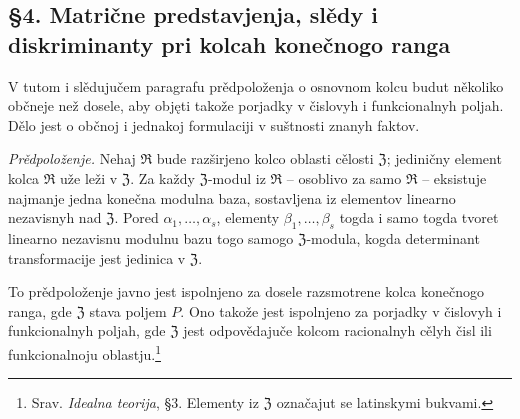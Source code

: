 \documentclass[11pt]{article}
\begin{document}
\setcounter{footnote}{23}

\subsection*{§4. Matrične predstavjenja, slědy i diskriminanty pri kolcah konečnogo ranga}

V tutom i slědujučem paragrafu prědpoloženja o osnovnom kolcu budut několiko občneje než dosele, aby objęti takože porjadky v čislovyh i funkcionalnyh poljah. Dělo jest o občnoj i jednakoj formulaciji v suštnosti znanyh faktov.

\emph{Prědpoloženje.} Nehaj $\mathfrak R$ bude razširjeno kolco oblasti cělosti $\mathfrak Z$; jediničny element kolca $\mathfrak R$ uže leži v $\mathfrak Z$. Za každy $\mathfrak Z$-modul iz $\mathfrak R$ -- osoblivo za samo $\mathfrak R$ -- eksistuje najmanje jedna konečna modulna baza, sostavljena iz elementov linearno nezavisnyh nad $\mathfrak Z$. Pored $\alpha_1,\ldots,\alpha_s$, elementy $\beta_1,\ldots,\beta_s$ togda i samo togda tvoret linearno nezavisnu modulnu bazu togo samogo $\mathfrak Z$-modula, kogda determinant transformacije jest jedinica v $\mathfrak Z$.

To prědpoloženje javno jest ispolnjeno za dosele razsmotrene kolca konečnogo ranga, gde $\mathfrak Z$ stava poljem $P$. Ono takože jest ispolnjeno za porjadky v čislovyh i funkcionalnyh poljah, gde $\mathfrak Z$ jest odpovědajuče kolcom racionalnyh cělyh čisl ili funkcionalnoju oblastju.\footnote{Srav. \emph{Idealna teorija}, §3. Elementy iz $\mathfrak Z$ označajut se latinskymi bukvami.}
\end{document}
